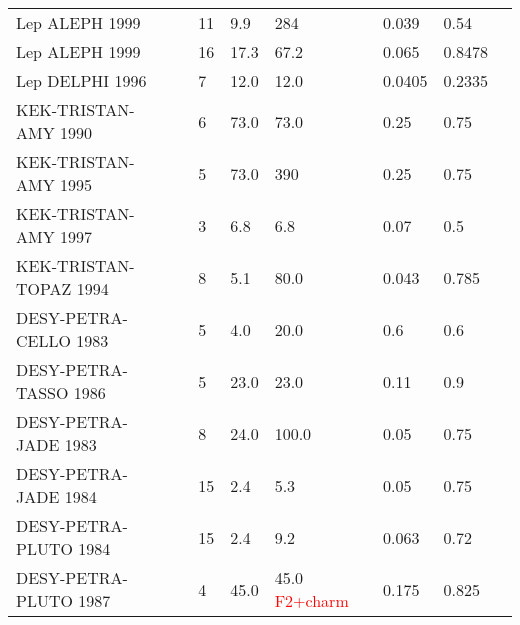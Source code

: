 \begin{landscape}
\begin{center}
\begin{tabular}{*8l}
	
	Lep ALEPH 1999  &  \cite{Barate:1999qy}&\hspace{1.0cm}  11&9.9& 284& 0.039&0.54 \\
	
	Lep ALEPH 1999  &  \cite{Heister:2003an}& \hspace{1.0cm}  16&17.3& 67.2& 0.065&0.8478 \\
	
	Lep DELPHI 1996  &  \cite{Abreu:1995xta}&\hspace{1.0cm}  7&12.0& 12.0& 0.0405&0.2335 \\



    KEK-TRISTAN-AMY  1990&  \cite{Sasaki:1990es}&\hspace{1.0cm}  6&73.0& 73.0& 0.25&0.75 \\	
	KEK-TRISTAN-AMY  1995 &  \cite{Sahu:1995gj}& \hspace{1.0cm} 5&73.0& 390& 0.25&0.75 \\		
	 KEK-TRISTAN-AMY  1997 &  \cite{Kojima:1997wg}& \hspace{1.0cm} 3&6.8& 6.8& 0.07&0.5 \\	
	 
	 
	 KEK-TRISTAN-TOPAZ  1994 &  \cite{Muramatsu:1994rq}& \hspace{1.0cm} 8&5.1& 80.0& 0.043&0.785 \\	
	 
	 DESY-PETRA-CELLO 1983&  \cite{Behrend:1983fq}&\hspace{1.0cm}  5&4.0& 20.0& 0.6&0.6 \\
	 
	 DESY-PETRA-TASSO 1986&  \cite{Althoff:1986fi}&\hspace{1.0cm}  5&23.0& 23.0& 0.11&0.9 \\
	 
	 DESY-PETRA-JADE 1983&  \cite{Bartel:1982ix}& \hspace{1.0cm} 8&24.0& 100.0& 0.05&0.75\\
	 DESY-PETRA-JADE 1984&\cite{Bartel:1984cg}&  \hspace{1.0cm} 15&2.4& 5.3 &0.05&0.75&\\
	 
	 
	 DESY-PETRA-PLUTO 1984&  \cite{Bartel:1982ix}&\hspace{1.0cm}  15&2.4& 9.2& 0.063&0.72\\
	 DESY-PETRA-PLUTO 1987&  \cite{Bartel:1982ix}&\hspace{1.0cm}  4&45.0& 45.0 \textcolor{red}{F2+charm}& 0.175&0.825\\
	 

\end{tabular}
\end{center}
\end{landscape}
